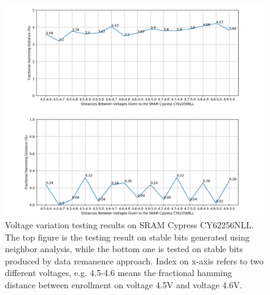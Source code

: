 \begin{figure}[tph!]
    \centerline{\includegraphics[width={1.1\textwidth}]{images/cy62256nll_hd_intra_voltage_stable}}
    \caption{Voltage variation testing results on SRAM Cypress CY62256NLL. The top figure is the testing result on stable bits generated using neighbor analysis, while the bottom one is tested on stable bits produced by data remanence approach. Index on x-axis refers to two different voltages, e.g. 4.5-4.6 means the fractional hamming distance between enrollment on voltage 4.5V and voltage 4.6V.}
    \label{fig:test_stable_cy62256nll_voltage}
\end{figure}

